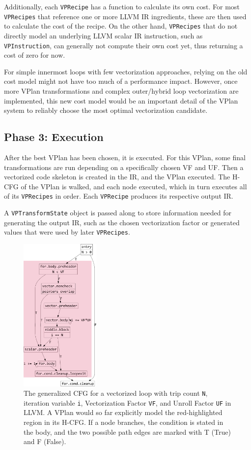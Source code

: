 \documentclass[sigplan,11pt,nonacm]{acmart}
\begin{document}
Additionally, each \texttt{VPRecipe} has a function to calculate its own cost. For most \texttt{VPRecipes} 
that reference one or more LLVM IR ingredients, these are then used to calculate the cost of the recipe.
On the other hand, \texttt{VPRecipes} that do not directly model an underlying LLVM scalar IR instruction, 
such as \texttt{VPInstruction}, can generally not compute their own cost yet, thus returning a cost of zero 
for now.

For simple innermost loops with few vectorization approaches,
relying on the old cost model might not have too much of a performance impact. 
However, once more VPlan transformations and complex
outer/hybrid loop vectorization are implemented, this new cost model would be an important
detail of the VPlan system to reliably choose the most optimal vectorization candidate.

\subsection{Phase 3: Execution}
After the best VPlan has been chosen, it is executed.
For this VPlan, some final transformations are run depending on a specifically chosen VF and UF.
Then a vectorized code skeleton is created in the IR, and the VPlan executed. 
The H-CFG of the VPlan is walked, and each node executed, which in turn executes all 
of its \texttt{VPRecipes} in order. Each \texttt{VPRecipe} produces its respective output IR.

A \texttt{VPTransformState} object is passed along to store information 
needed for generating the output IR, such as the chosen vectorization factor or generated values that were 
used by later \texttt{VPRecipes}.

\begin{figure}
  \centering
  \includegraphics[width=0.35\textwidth]{images/inner-loop-vec-loop-cfg-color.png}
  \caption{The generalized CFG for a vectorized loop with trip count \texttt{N}, 
  iteration variable \texttt{i}, Vectorization Factor \texttt{VF}, 
  and Unroll Factor \texttt{UF} in LLVM. A VPlan would so far explicitly model the red-highlighted 
  region in its H-CFG. If a node branches, the condition is stated in the body, and the two possible 
  path edges are marked with T (True) and F (False).}
  \label{fig:inner-loop-vec-cfg}
\end{figure}
\end{document}
